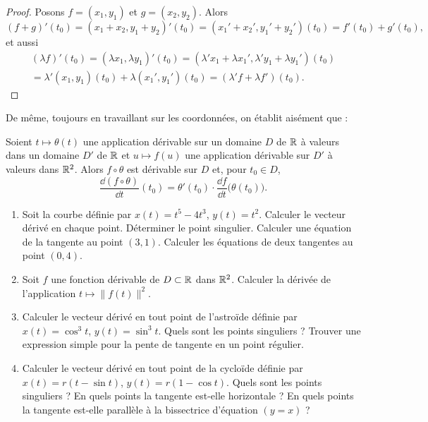 \documentclass[class=report,crop=false]{standalone}
\begin{document}
\begin{proof}
Posons ${f}=(x_1,y_1)$ et ${g}=(x_2,y_2)$. Alors
$$({f}+{g})'(t_0)=(x_1+x_2,y_1+y_2)'(t_0)
=(x_1'+x_2',y_1'+y_2')(t_0)={f}'(t_0)+{g}'(t_0),$$
et aussi
\begin{multline*}
(\lambda{f})'(t_0)=(\lambda x_1,\lambda y_1)'(t_0)
=(\lambda'x_1+\lambda x_1',\lambda'y_1+\lambda y_1')(t_0)\\
=\lambda'(x_1,y_1)(t_0)+\lambda(x_1',y_1')(t_0)
=(\lambda'{f}+\lambda{f}')(t_0).
\end{multline*}
\end{proof}


De même, toujours en travaillant sur les coordonnées, on établit aisément que :
\begin{theoreme}
Soient $t\mapsto\theta(t)$ une application dérivable sur un domaine
$D$ de $\mathbb{R}$ à valeurs dans un domaine $D'$ de $\mathbb{R}$ et $u\mapsto {f}(u)$
une application dérivable sur $D'$ à valeurs dans $\mathbb{R}^2$. Alors
${f}\circ\theta$ est dérivable sur $D$ et, pour $t_0\in D$,
$${\frac{\dd({f}\circ\theta)}{\dd t}}(t_0)
=\theta'(t_0) \cdot {\dfrac{\dd {f}}{\dd t}}\big(\theta(t_0)\big).$$
\end{theoreme}



\begin{miniexercices}
\sauteligne
\begin{enumerate}
  \item Soit la courbe définie par $x(t)= t^5-4t^3$, $y(t)=t^2$.
  Calculer le vecteur dérivé en chaque point. Déterminer le point singulier.
  Calculer une équation de la tangente au point $(3,1)$.
  Calculer les équations de deux tangentes au point $(0,4)$.

  \item Soit $f$ une fonction dérivable de $D \subset \mathbb{R}$ dans $\mathbb{R}^2$.
  Calculer la dérivée de l'application $t \mapsto \| f(t) \|^2$.

  \item Calculer le vecteur dérivé en tout point de l'astroïde définie par $x(t) = \cos^3 t$,
  $y(t) = \sin^3 t$. Quels sont les points singuliers ? Trouver une expression simple pour
  la pente de tangente en un point régulier.

  \item Calculer le vecteur dérivé en tout point de la cycloïde définie par
  $x(t) = r(t-\sin t)$,  $y(t) = r(1-\cos t)$. Quels sont les points singuliers ?
  En quels points la tangente est-elle horizontale ? En quels points la tangente est-elle
  parallèle à la bissectrice d'équation $(y=x)$ ?

\end{enumerate}
\end{miniexercices}
\end{document}
